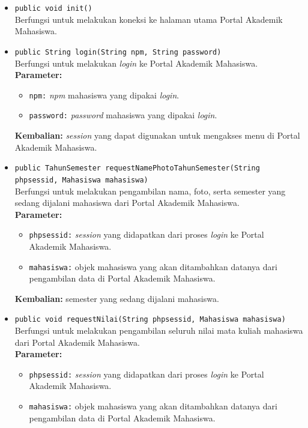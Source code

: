 \begin{enumerate}
\begin{itemize}
        \item \texttt{public void init()}\\
			Berfungsi untuk melakukan koneksi ke halaman utama Portal Akademik Mahasiswa.

		\item \texttt{public String login(String npm, String password)}\\
		    Berfungsi untuk melakukan \textit{login} ke Portal Akademik Mahasiswa.\\
		\textbf{Parameter:}
			\begin{itemize}
				\item \texttt{npm:} \textit{npm} mahasiswa yang dipakai \textit{login}.
				\item \texttt{password:} \textit{password} mahasiswa yang dipakai \textit{login}.
			\end{itemize}
		\textbf{Kembalian:} \textit{session} yang dapat digunakan untuk mengakses menu di Portal Akademik Mahasiswa.
		
	    \item \texttt{public TahunSemester requestNamePhotoTahunSemester(String phpsessid, Mahasiswa mahasiswa)}\\
		    Berfungsi untuk melakukan pengambilan nama, foto, serta semester yang sedang dijalani mahasiswa dari Portal Akademik Mahasiswa.\\
		\textbf{Parameter:}
			\begin{itemize}
				\item \texttt{phpsessid:} \textit{session} yang didapatkan dari proses \textit{login} ke Portal Akademik Mahasiswa.
				\item \texttt{mahasiswa:} objek mahasiswa yang akan ditambahkan datanya dari pengambilan data di Portal Akademik Mahasiswa.
			\end{itemize}
		\textbf{Kembalian:} semester yang sedang dijalani mahasiswa.
		
		\item \texttt{public void requestNilai(String phpsessid, Mahasiswa mahasiswa)}\\
		    Berfungsi untuk melakukan pengambilan seluruh nilai mata kuliah mahasiswa dari Portal Akademik Mahasiswa.\\
		\textbf{Parameter:}
			\begin{itemize}
				\item \texttt{phpsessid:} \textit{session} yang didapatkan dari proses \textit{login} ke Portal Akademik Mahasiswa.
				\item \texttt{mahasiswa:} objek mahasiswa yang akan ditambahkan datanya dari pengambilan data di Portal Akademik Mahasiswa.
			\end{itemize}
			

\end{itemize}
\end{enumerate}
